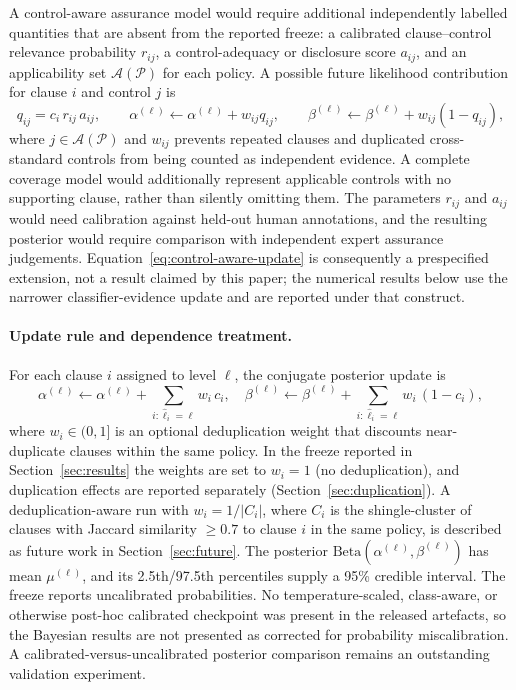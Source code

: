 \documentclass[final,3p,times,twocolumn]{elsarticle}
\begin{document}
	A control-aware assurance model would require additional independently
	labelled quantities that are absent from the reported freeze: a calibrated
	clause--control relevance probability $r_{ij}$, a control-adequacy or
	disclosure score $a_{ij}$, and an applicability set $\mathcal{A}(\mathcal{P})$
	for each policy. A possible future likelihood contribution for clause $i$
	and control $j$ is
	\begin{equation}
	q_{ij}=c_i\,r_{ij}\,a_{ij}, \qquad
	\alpha^{(\ell)}\leftarrow\alpha^{(\ell)}+w_{ij}q_{ij}, \qquad
	\beta^{(\ell)}\leftarrow\beta^{(\ell)}+w_{ij}(1-q_{ij}), 
	\label{eq:control-aware-update}
	\end{equation}
	where $j\in\mathcal{A}(\mathcal{P})$ and $w_{ij}$ prevents repeated clauses
	and duplicated cross-standard controls from being counted as independent
	evidence. A complete coverage model would additionally represent applicable
	controls with no supporting clause, rather than silently omitting them. The
	parameters $r_{ij}$ and $a_{ij}$ would need calibration against held-out
	human annotations, and the resulting posterior would require comparison with
	independent expert assurance judgements. Equation~\ref{eq:control-aware-update}
	is consequently a prespecified extension, not a result claimed by this paper;
	the numerical results below use the narrower classifier-evidence update and
	are reported under that construct.
    
	\paragraph{Update rule and dependence treatment.}
	For each clause $i$ assigned to level $\ell$, the conjugate posterior update
	is
	\begin{equation}
		\alpha^{(\ell)}\leftarrow \alpha^{(\ell)}+ \sum_{i: \hat{\ell}_i = \ell}w_{i}
		\, c_{i}, \quad \beta^{(\ell)}\leftarrow \beta^{(\ell)}+ \sum_{i: \hat{\ell}_i
		= \ell}w_{i} \, (1 - c_{i}), \label{eq:bayes-update}
	\end{equation}
	where $w_{i} \in (0, 1]$ is an optional deduplication weight that discounts
	near-duplicate clauses within the same policy. In the freeze reported in Section~\ref{sec:results}
	the weights are set to $w_{i} = 1$ (no deduplication), and duplication effects
	are reported separately (Section~\ref{sec:duplication}). A deduplication-aware
	run with $w_{i} = 1/|C_{i}|$, where $C_{i}$ is the shingle-cluster of clauses
	with Jaccard similarity $\geq 0.7$ to clause $i$ in the same policy, is described
	as future work in Section~\ref{sec:future}. The posterior
	$\mathrm{Beta}(\alpha^{(\ell)}, \beta^{(\ell)})$ has mean $\mu^{(\ell)}$, and its
	2.5th/97.5th percentiles supply a 95\% credible interval.
	The freeze reports uncalibrated probabilities. No temperature-scaled,
	class-aware, or otherwise post-hoc calibrated checkpoint was present in the
	released artefacts, so the Bayesian results are not presented as corrected for
	probability miscalibration. A calibrated-versus-uncalibrated posterior
	comparison remains an outstanding validation experiment.
\end{document}
